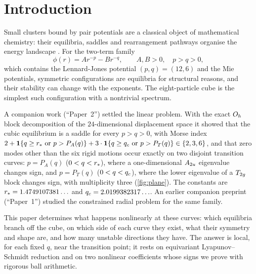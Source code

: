 \section{Introduction}\label{sec:intro}

Small clusters bound by pair potentials are a classical object of mathematical chemistry: their equilibria,
saddles and rearrangement pathways organise the energy landscape
\citep{HoarePal1971,HoareMcInnes1983,DoyeWales2002,Trombach2018,SchwerdtfegerWales2024}. For the two-term family
\begin{equation}\label{eq:pot}
\phi(r)=Ar^{-p}-Br^{-q},\qquad A,B>0,\quad p>q>0,
\end{equation}
which contains the Lennard-Jones potential $(p,q)=(12,6)$ and the Mie potentials, symmetric configurations are
equilibria for structural reasons, and their stability can change with the exponents. The eight-particle cube is the
simplest such configuration with a nontrivial spectrum.

A companion work \citep{Paper2} (``Paper~2'') settled the linear problem. With the exact $O_{h}$ block decomposition of
the $24$-dimensional displacement space it showed that the cubic equilibrium is a saddle for every $p>q>0$, with Morse
index $2+\mathbf{1}\{q\ge r_{*}\text{ or }p>P_A(q)\}+3\cdot\mathbf{1}\{q\ge q_{c}\text{ or }p>P_T(q)\}\in\{2,3,6\}$, and that zero
modes other than the six rigid motions occur exactly on two disjoint transition curves: $p=P_A(q)$ ($0<q<r_{*}$),
where a one-dimensional $A_{2u}$ eigenvalue changes sign, and $p=P_T(q)$ ($0<q<q_{c}$), where the lower eigenvalue of a
$T_{2g}$ block changes sign, with multiplicity three (\cref{fig:plane}). The constants are $r_{*}=1.4749107381\ldots$ and
$q_{c}=2.0199382317\ldots$. An earlier companion preprint \citep{Paper1} (``Paper~1'') studied the constrained radial
problem for the same family.

This paper determines what happens nonlinearly at these curves: which equilibria branch off the cube, on which side
of each curve they exist, what their symmetry and shape are, and how many unstable directions they have. The answer is
local, for each fixed $q$, near the transition point; it rests on equivariant Lyapunov--Schmidt reduction
\citep{GolubitskySchaeffer1985,GolubitskyStewartSchaeffer1988,ChossatLauterbach2000,Field2007} and on two nonlinear
coefficients whose signs we prove with rigorous ball arithmetic.


